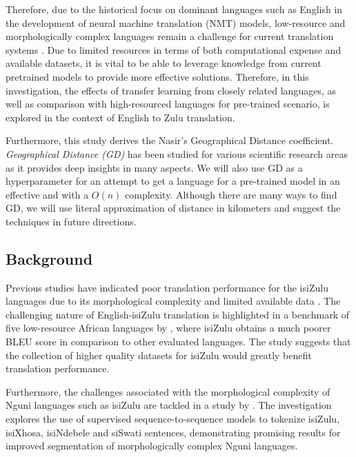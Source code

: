 \documentclass[11pt]{article}
\begin{document}
Therefore, due to the historical focus on dominant languages such as English in the development of neural machine translation (NMT) models, low-resource and morphologically complex languages remain a challenge for current translation systems \citep{haddow2021survey,koehn2017six}. Due to limited resources in terms of both computational expense and available datasets, it is vital to be able to leverage knowledge from current pretrained models to provide more effective solutions. Therefore, in this investigation, the effects of transfer learning from closely related languages, as well as comparison with high-resourced languages for pre-trained scenario, is explored in the context of English to Zulu translation.

Furthermore, this study derives the Nasir's Geographical Distance coefficient. \emph{Geographical Distance (GD)} \citep{holman2007relation} has been studied for various scientific research areas \citep{bei2021motivations,krajsa2011rtt,riginos2001population} as it provides deep insights in many aspects. We will also use GD as a hyperparameter for an attempt to get a language for a pre-trained model in an effective and with a $O(n)$ complexity. Although there are many ways to find GD, we will use literal approximation of distance in kilometers and suggest the techniques in future directions.










\subsection{Background}


Previous studies have indicated poor translation performance for the isiZulu languages due to its morphological complexity and limited available data \citep{martinus2019focus}. The challenging nature of English-isiZulu translation is highlighted in a benchmark of five low-resource African languages by \citet{martinus2019focus}, where isiZulu obtains a much poorer BLEU score in comparison to other evaluated languages. The study suggests that the collection of higher quality datasets for isiZulu would greatly benefit translation performance. 

Furthermore, the challenges associated with the morphological complexity of Nguni languages such as isiZulu are tackled in a study by \citet{moeng2021canonical}. The investigation explores the use of supervised sequence-to-sequence models to tokenize isiZulu, isiXhosa, isiNdebele and siSwati sentences, demonstrating promising results for improved segmentation of morphologically complex Nguni languages.
\end{document}
